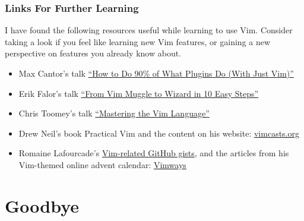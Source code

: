 \documentclass{beamer}
\begin{document}
\begin{frame}[fragile]
    \frametitle{Links For Further Learning}
    \small
    I have found the following resources useful while learning to use Vim. Consider taking a look if you feel like learning new Vim features, or gaining a new perspective on features you already know about.
    \begin{itemize}
	\item Max Cantor's talk \href{https://www.youtube.com/watch?v=XA2WjJbmmoM}{\enquote{How to Do 90\% of What Plugins Do (With Just Vim)}}
	\item Erik Falor's talk \href{https://www.youtube.com/watch?v=MquaityA1SM}{\enquote{From Vim Muggle to Wizard in 10 Easy Steps}}
	\item Chris Toomey's talk \href{https://www.youtube.com/watch?v=wlR5gYd6um0&t=132s}{\enquote{Mastering the Vim Language}}
	\item Drew Neil's book Practical Vim and the content on his website: \href{http://vimcasts.org}{vimcasts.org}
	\item Romaine Lafourcade's \href{https://gist.github.com/romainl/4b9f139d2a8694612b924322de1025ce}{Vim-related GitHub gists}, and the articles from his Vim-themed online advent calendar: \href{https://vimways.org/2019/}{Vimways}
    \end{itemize}
\end{frame}

\section{Goodbye}
\end{document}
